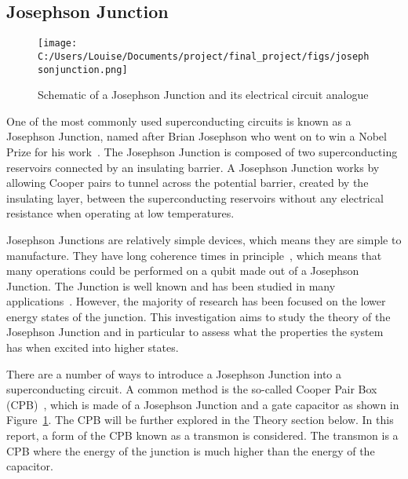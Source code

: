 \documentclass[11pt]{article}
\begin{document}
\subsection{Josephson Junction}
\begin{figure}[ht]
\centering
\texttt{[image: C:/Users/Louise/Documents/project/final\_project/figs/josephsonjunction.png]}
\caption{Schematic of a Josephson Junction and its electrical circuit analogue}
\label{fig:picture1}
\end{figure}
One of the most commonly used superconducting circuits is known as a Josephson Junction, named after Brian Josephson who went on to win a Nobel Prize for his work~\cite{josephsonDiscoveryTunnellingSupercurrents1974,josephsonPossibleNewEffects1962}.
The Josephson Junction is composed of two superconducting reservoirs connected by an insulating barrier.
A Josephson Junction works by allowing Cooper pairs to tunnel across the potential barrier, created by the insulating layer, between the superconducting reservoirs without any electrical resistance when operating at low temperatures.

Josephson Junctions are relatively simple devices, which means they are simple to manufacture. They have long coherence times in principle~\cite{paikObservationHighCoherence2011}, which means that many operations could be performed on a qubit made out of a Josephson Junction. The Junction is well known and has been studied in many applications~\cite{yuCoherentTemporalOscillations2002,simmondsDecoherenceJosephsonPhase2004}. However, the majority of research has been focused on the lower energy states of the junction. This investigation aims to study the theory of the Josephson Junction and in particular to assess what the properties the system has when excited into higher states.

There are a number of ways to introduce a Josephson Junction into a superconducting circuit. A common method is the so-called Cooper Pair Box (CPB)~\cite{bladhSingleCooperpairBox2005}, which is made of a Josephson Junction and a gate capacitor as shown in Figure~\ref{fig:picture1}. The CPB will be further explored in the Theory section below. In this report, a form of the CPB known as a transmon is considered. The transmon is a CPB where the energy of the junction is much higher than the energy of the capacitor.
\end{document}
